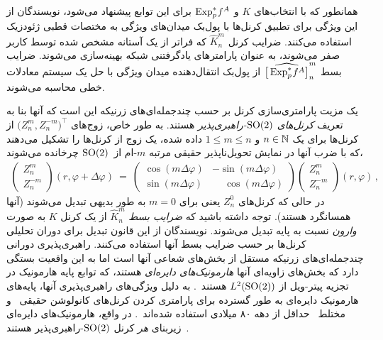 همانطور که با انتخاب‌های $K$ و $\operatorname{Exp}^*_p\mkern-2mu f^A$ برای این توابع پیشنهاد می‌شود، نویسندگان از این ویژگی برای تطبیق کرنل‌ها با پول‌بک میدان‌های ویژگی به مختصات قطبی ژئودزیک استفاده می‌کنند.
ضرایب کرنل $\widehat{K}_n^m$ که فراتر از یک آستانه مشخص شده توسط کاربر صفر می‌شوند، به عنوان پارامترهای یادگرفتنی شبکه بهینه‌سازی می‌شوند.
ضرایب بسط $\widehat{\big[\operatorname{Exp}^*_p\mkern-2mu f^A\big]}_n^m$ از پول‌بک انتقال‌دهنده میدان ویژگی با حل یک سیستم معادلات خطی محاسبه می‌شوند.

یک مزیت پارامتری‌سازی کرنل بر حسب چندجمله‌ای‌های زرنیکه این است که آنها بنا به تعریف \emph{کرنل‌های $\operatorname{SO}(2)$-راهبری‌پذیر} هستند.
به طور خاص، زوج‌های $\big(Z_n^m, Z_n^{-m}\big)^\top$ از کرنل‌ها برای یک $n\in\mathbb{N}$ و $1\leq m\leq n$ داده شده، یک زوج از کرنل‌ها را تشکیل می‌دهند که با ضرب آنها در نمایش تحویل‌ناپذیر حقیقی مرتبه $m$-ام از~$\operatorname{SO}(2)$ چرخانده می‌شوند،
\begin{align}
	\begin{pmatrix}
		Z_n^m \\ Z_n^{-m}
	\end{pmatrix}
	(r,\varphi + \Delta\varphi)
	\ =\ 
	\begin{pmatrix}
		\cos(m\Delta\varphi) &         -  \sin(m\Delta\varphi) \\
		\sin(m\Delta\varphi) & \phantom{-} \cos(m\Delta\varphi)
	\end{pmatrix}
	\begin{pmatrix}
		Z_n^m \\ Z_n^{-m}
	\end{pmatrix}
	(r,\varphi) \,,
\end{align}
در حالی که کرنل‌های $Z_n^0$ یعنی برای $m=0$ به طور بدیهی تبدیل می‌شوند (آنها همسانگرد هستند).
توجه داشته باشید که \emph{ضرایب بسط} $\widehat{K}_n^m$ از یک کرنل $K$ به صورت \emph{وارون} نسبت به پایه تبدیل می‌شوند.
نویسندگان از این قانون تبدیل برای دوران تحلیلی کرنل‌ها بر حسب ضرایب بسط آنها استفاده می‌کنند.
راهبری‌پذیری دورانی چندجمله‌ای‌های زرنیکه مستقل از بخش‌های شعاعی آنها است اما به این واقعیت بستگی دارد که بخش‌های زاویه‌ای آنها \emph{هارمونیک‌های دایره‌ای} هستند، که توابع پایه هارمونیک در تجزیه پیتر-ویل از $L^2(\operatorname{SO}(2))$ هستند~\cite{lang2020WignerEckart}.
به دلیل ویژگی‌های راهبری‌پذیری آنها، پایه‌های هارمونیک دایره‌ای به طور گسترده برای پارامتری کردن کرنل‌های کانولوشن حقیقی~\cite{Weiler2018SFCNN,graham2020dense} و مختلط~\cite{Worrall2017-HNET,Wiersma2020} حداقل از دهه ۸۰ میلادی استفاده شده‌اند~\cite{Hsu1982optical,Rosen1988circularHarmonic,freeman1991design,hel1998canonical}.
در واقع، هارمونیک‌های دایره‌ای زیربنای \emph{هر} کرنل $\operatorname{SO}(2)$-راهبری‌پذیر هستند~\cite{Weiler2019_E2CNN,lang2020WignerEckart}.

